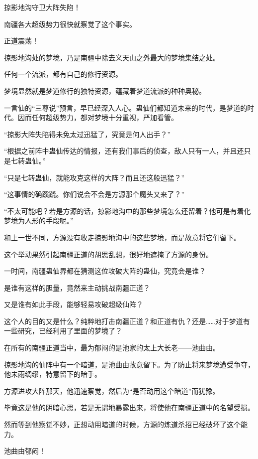 
\begin{this_body}

掠影地沟守卫大阵失陷！

南疆各大超级势力很快就察觉了这个事实。

正道震荡！

掠影地沟处的梦境，乃是南疆中除去义天山之外最大的梦境集结之处。

任何一个流派，都有自己的修行资源。

梦境显然就是梦道修行的独特资源，蕴藏着梦道流派的种种奥秘。

一言仙的“三尊说”预言，早已经深入人心。蛊仙们都知道未来的时代，是梦道的时代。因而任何超级势力，都对梦境十分重视，严加看管。

“掠影大阵失陷得未免太过迅猛了，究竟是何人出手？”

“根据之前阵中蛊仙传达的情报，还有我们事后的侦查，敌人只有一人，并且还只是七转蛊仙。”

“只是七转蛊仙，就能攻克这样的大阵？而且还这般迅猛？”

“这事情的确蹊跷。你们说会不会是方源那个魔头又来了？”

“不太可能吧？若是方源的话，掠影地沟中的那些梦境怎么还留着？他可是有着化梦境为人形的手段呢。”

和上一世不同，方源没有收走掠影地沟中的这些梦境，而是故意将它们留下。

这个举动果然引起南疆正道的胡思乱想，很好地遮掩了方源的身份。

一时间，南疆蛊仙界都在猜测这位攻破大阵的蛊仙，究竟会是谁？

是谁有这样的胆量，竟然来主动挑战南疆正道？

又是谁有如此手段，能够轻易攻破超级仙阵？

这个人的目的又是什么？纯粹地打击南疆正道？和正道有仇？还是……对于梦道有一些研究，已经利用了里面的梦境了？

在所有的南疆正道当中，最为郁闷的是池家的太上大长老——池曲由。

掠影地沟的仙阵中有一个暗道，是池曲由故意留下。为了防止将来梦境遭受争夺，他未雨绸缪，特意留下的暗手。

方源进攻大阵那天，他迅速察觉，然后为“是否动用这个暗道”而犹豫。

毕竟这是他的阴暗心思，若是无谓地暴露出来，将使他在南疆正道中的名望受损。

然而等到他察觉不妙，正想动用暗道的时候，方源的炼道杀招已经破坏了这个能力。

池曲由郁闷！


\end{this_body}

